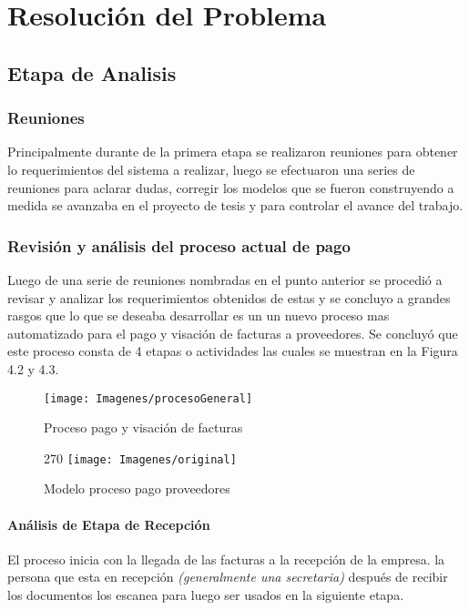 \section{Resolución  del Problema}
	
	\subsection{Etapa de Analisis}

	\subsubsection{Reuniones} 
	Principalmente durante de la primera etapa se realizaron reuniones para obtener lo requerimientos del sistema a realizar, luego se efectuaron una series de reuniones para aclarar dudas, corregir los modelos que se fueron construyendo a medida se avanzaba en el proyecto de tesis y para controlar el avance del trabajo.
		
	\subsubsection{Revisión y análisis del proceso actual de pago} 
	Luego de una serie de reuniones nombradas en el punto anterior se procedió a revisar y analizar los requerimientos obtenidos de estas y se concluyo a grandes rasgos que lo que se deseaba desarrollar es un un nuevo proceso mas automatizado para el pago y visación de facturas a proveedores. Se concluyó que este proceso consta de 4 etapas o actividades las cuales se muestran en la Figura 4.2 y 4.3.

	\begin{figure}[H]
		\centering
		\texttt{[image: Imagenes/procesoGeneral]}
		\caption{Proceso pago y visación de facturas}
	\end{figure}
	
	\begin{figure}[H]
		\begin{turn}{270}
			\texttt{[image: Imagenes/original]}
		\end{turn}
		\caption{Modelo proceso pago proveedores}
	\end{figure}

	\paragraph{Análisis de Etapa de Recepción}
	 El proceso inicia con la llegada de las facturas a la recepción de la empresa. la persona que esta en recepción \textit{(generalmente una secretaria)} después de recibir los documentos los escanea para luego ser usados en la siguiente etapa.
			
